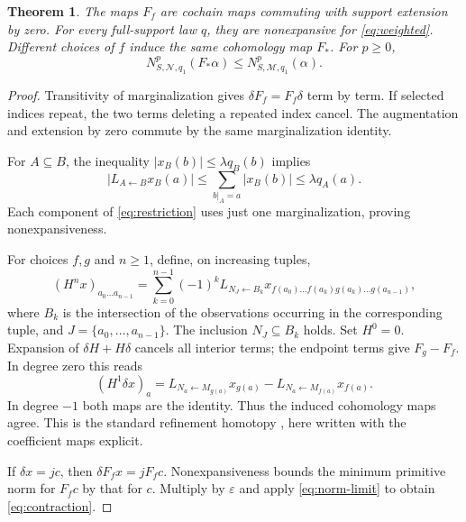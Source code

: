 \documentclass[11pt,a4paper]{article}
\numberwithin{equation}{section}
\newtheorem{theorem}{Theorem}[section]
\theoremstyle{remark}
\newcommand{\M}{\mathcal M}
\begin{document}
\begin{theorem}\label{thm:restriction}
The maps $F_f$ are cochain maps commuting with support extension by zero. For every full-support law $q$, they are nonexpansive for \eqref{eq:weighted}. Different choices of $f$ induce the same cohomology map $F_*$. For $p\ge0$,
\begin{equation}\label{eq:contraction}
 N^p_{S,\mathcal N,q_1}(F_*\alpha)\le N^p_{S,\M,q_1}(\alpha).
\end{equation}
\end{theorem}
\begin{proof}
Transitivity of marginalization gives $\delta F_f=F_f\delta$ term by term. If selected indices repeat, the two terms deleting a repeated index cancel. The augmentation and extension by zero commute by the same marginalization identity.

For $A\subseteq B$, the inequality $|x_B(b)|\le\lambda q_B(b)$ implies
\begin{equation}\label{eq:box-contraction}
 |L_{A\leftarrow B}x_B(a)|\le\sum_{b|_A=a}|x_B(b)|\le\lambda q_A(a).
\end{equation}
Each component of \eqref{eq:restriction} uses just one marginalization, proving nonexpansiveness.

For choices $f,g$ and $n\ge1$, define, on increasing tuples,
\begin{equation}\label{eq:homotopy}
 (H^nx)_{a_0\ldots a_{n-1}}=
 \sum_{k=0}^{n-1}(-1)^k L_{N_J\leftarrow B_k}
 x_{f(a_0)\ldots f(a_k)g(a_k)\ldots g(a_{n-1})},
\end{equation}
where $B_k$ is the intersection of the observations occurring in the corresponding tuple, and $J=\{a_0,\ldots,a_{n-1}\}$. The inclusion $N_J\subseteq B_k$ holds. Set $H^0=0$. Expansion of $\delta H+H\delta$ cancels all interior terms; the endpoint terms give $F_g-F_f$. In degree zero this reads
\[
 (H^1\delta x)_a=L_{N_a\leftarrow M_{g(a)}}x_{g(a)}
 -L_{N_a\leftarrow M_{f(a)}}x_{f(a)}.
\]
In degree $-1$ both maps are the identity. Thus the induced cohomology maps agree. This is the standard refinement homotopy \cite[Proposition~6.10 and Theorem~6.30]{BPSV}, here written with the coefficient maps explicit.

If $\delta x=jc$, then $\delta F_fx=jF_fc$. Nonexpansiveness bounds the minimum primitive norm for $F_fc$ by that for $c$. Multiply by $\varepsilon$ and apply \eqref{eq:norm-limit} to obtain \eqref{eq:contraction}.
\end{proof}
\end{document}
